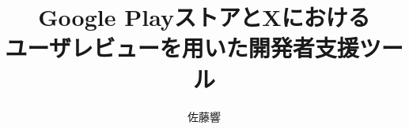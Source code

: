\documentclass[report, a4paper, 12pt]{jsbook}
\title{Google PlayストアとXにおける\mbox{}\\ユーザレビューを用いた開発者支援ツール}
\author{佐藤響}
\date{}
\begin{document}
\makecover    %
\makeabstract %
\maketitle    %
\maketoc      %















% 
\end{document}
